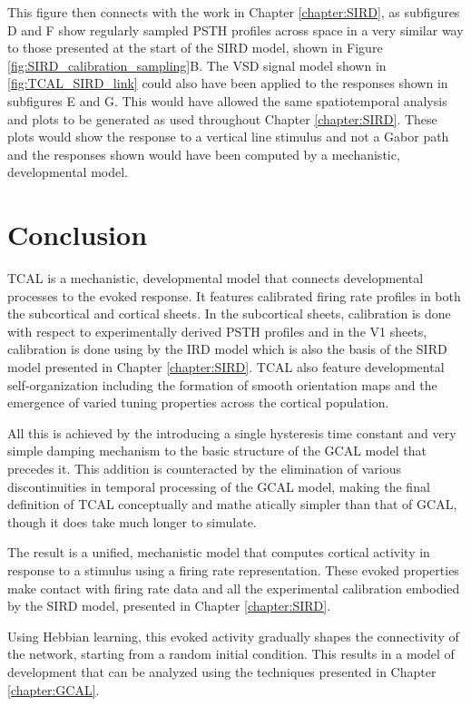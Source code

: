 \documentclass[phd,ianc,twoside]{infthesis}
\begin{document}
This figure then connects with the work in Chapter \ref{chapter:SIRD}, as
subfigures D and F show regularly sampled PSTH profiles across space in
a very similar way to those presented at the start of the SIRD model,
shown in Figure \ref{fig:SIRD_calibration_sampling}B. The VSD signal
model shown in \ref{fig:TCAL_SIRD_link} could also have been applied to
the responses shown in subfigures E and G. This would have allowed the
same spatiotemporal analysis and plots to be generated as used
throughout Chapter \ref{chapter:SIRD}. These plots would show the
response to a vertical line stimulus and not a Gabor path and the
responses shown would have been computed by a mechanistic, developmental
model.

\section{Conclusion}

TCAL is a mechanistic, developmental model that connects developmental
processes to the evoked response. It features calibrated firing rate
profiles in both the subcortical and cortical sheets. In the subcortical
sheets, calibration is done with respect to experimentally derived PSTH
profiles and in the V1 sheets, calibration is done using by the IRD
model which is also the basis of the SIRD model presented in Chapter
\ref{chapter:SIRD}. TCAL also feature developmental self-organization
including the formation of smooth orientation maps and the emergence of
varied tuning properties across the cortical population.

All this is achieved by the introducing a single hysteresis time
constant and very simple damping mechanism to the basic structure of the
GCAL model that precedes it. This addition is counteracted by the
elimination of various discontinuities in temporal processing of the
GCAL model, making the final definition of TCAL conceptually and mathe
atically simpler than that of GCAL, though it does take much longer to
simulate.

The result is a unified, mechanistic model that computes cortical
activity in response to a stimulus using a firing rate representation.
These evoked properties make contact with firing rate data and all the
experimental calibration embodied by the SIRD model, presented in
Chapter \ref{chapter:SIRD}.

Using Hebbian learning, this evoked activity gradually shapes the
connectivity of the network, starting from a random initial
condition. This results in a model of development that can be analyzed
using the techniques presented in Chapter \ref{chapter:GCAL}.
\end{document}
